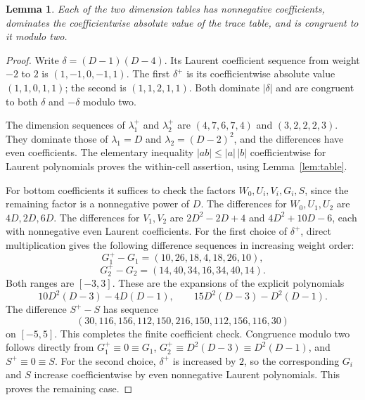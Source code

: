 \documentclass[11pt]{article}
\newtheorem{lemma}[theorem]{Lemma}\newtheorem{corollary}[theorem]{Corollary}
\theoremstyle{definition}\newtheorem{definition}[theorem]{Definition}
\begin{document}
\begin{lemma}\label{lem:positive}
Each of the two dimension tables has nonnegative coefficients, dominates the coefficientwise absolute value of the trace table, and is congruent to it modulo two.
\end{lemma}
\begin{proof}
Write $\delta=(D-1)(D-4)$. Its Laurent coefficient sequence from weight $-2$ to $2$ is $(1,-1,0,-1,1)$. The first $\delta^+$ is its coefficientwise absolute value $(1,1,0,1,1)$; the second is $(1,1,2,1,1)$. Both dominate $|\delta|$ and are congruent to both $\delta$ and $-\delta$ modulo two.

The dimension sequences of $\lambda_1^+$ and $\lambda_2^+$ are $(4,7,6,7,4)$ and $(3,2,2,2,3)$. They dominate those of $\lambda_1=D$ and $\lambda_2=(D-2)^2$, and the differences have even coefficients. The elementary inequality $|ab|\le |a|\,|b|$ coefficientwise for Laurent polynomials proves the within-cell assertion, using Lemma~\ref{lem:table}.

For bottom coefficients it suffices to check the factors $W_0,U_i,V_i,G_i,S$, since the remaining factor is a nonnegative power of $D$. The differences for $W_0,U_1,U_2$ are $4D,2D,6D$. The differences for $V_1,V_2$ are $2D^2-2D+4$ and $4D^2+10D-6$, each with nonnegative even Laurent coefficients. For the first choice of $\delta^+$, direct multiplication gives the following difference sequences in increasing weight order:
\[
 G_1^+-G_1=(10,26,18,4,18,26,10),
\]
\[
 G_2^+-G_2=(14,40,34,16,34,40,14).
\]
Both ranges are $[-3,3]$. These are the expansions of the explicit polynomials
\[
 10D^2(D-3)-4D(D-1),\qquad
 15D^2(D-3)-D^2(D-1).
\]
The difference $S^+-S$ has sequence
\[
 (30,116,156,112,150,216,150,112,156,116,30)
\]
on $[-5,5]$. This completes the finite coefficient check. Congruence modulo two follows directly from $G_1^+\equiv0\equiv G_1$, $G_2^+\equiv D^2(D-3)\equiv D^2(D-1)$, and $S^+\equiv0\equiv S$. For the second choice, $\delta^+$ is increased by $2$, so the corresponding $G_i$ and $S$ increase coefficientwise by even nonnegative Laurent polynomials. This proves the remaining case.
\end{proof}
\end{document}
